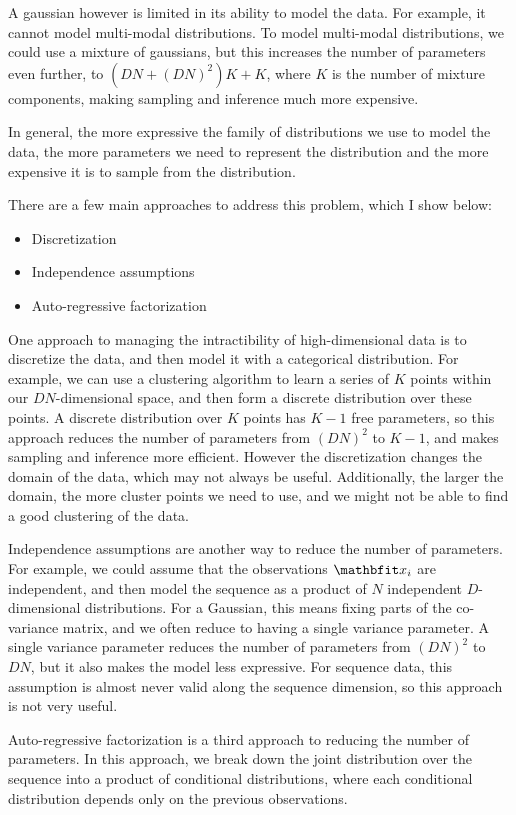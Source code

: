 A gaussian however is limited in its ability to model the data. For example, it cannot model multi-modal distributions. To model multi-modal distributions, we could use a mixture of gaussians, but this increases the number of parameters even further, to $(DN + (DN)^2)K + K$, where $K$ is the number of mixture components, making sampling and inference much more expensive.

In general, the more expressive the family of distributions we use to model the data, the more parameters we need to represent the distribution and the more expensive it is to sample from the distribution.

There are a few main approaches to address this problem, which I show below:

\begin{itemize}
    \item Discretization
    \item Independence assumptions
    \item Auto-regressive factorization
\end{itemize}

One approach to managing the intractibility of high-dimensional data is to discretize the data, and then model it with a categorical distribution. For example, we can use a clustering algorithm to learn a series of $K$ points within our $DN$-dimensional space, and then form a discrete distribution over these points. A discrete distribution over $K$ points has $K-1$ free parameters, so this approach reduces the number of parameters from $(DN)^2$ to $K-1$, and makes sampling and inference more efficient. However the discretization changes the domain of the data, which may not always be useful. Additionally, the larger the domain, the more cluster points we need to use, and we might not be able to find a good clustering of the data.

Independence assumptions are another way to reduce the number of parameters. For example, we could assume that the observations $\x_i$ are independent, and then model the sequence as a product of $N$ independent $D$-dimensional distributions. For a Gaussian, this means fixing parts of the co-variance matrix, and we often reduce to having a single variance parameter. A single variance parameter reduces the number of parameters from $(DN)^2$ to $DN$, but it also makes the model less expressive. For sequence data, this assumption is almost never valid along the sequence dimension, so this approach is not very useful.

Auto-regressive factorization is a third approach to reducing the number of parameters. In this approach, we break down the joint distribution over the sequence into a product of conditional distributions, where each conditional distribution depends only on the previous observations.

